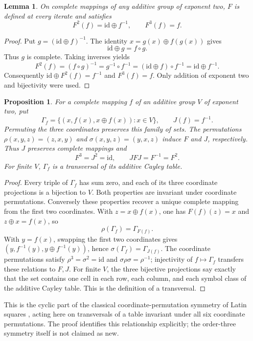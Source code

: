 \documentclass[11pt]{article}
\newtheorem{lemma}[theorem]{Lemma}
\newtheorem{proposition}[theorem]{Proposition}
\begin{document}
\begin{lemma}\label{lem:F3}
On complete mappings of any additive group of exponent two, $F$ is defined
at every iterate and satisfies
\[
F^2(f)=\mathrm{id}\oplus f^{-1},\qquad F^3(f)=f.
\]
\end{lemma}
\begin{proof}
Put $g=(\mathrm{id}\oplus f)^{-1}$. The identity
$x=g(x)\oplus f(g(x))$ gives
\[
\mathrm{id}\oplus g=f\circ g.
\]
Thus $g$ is complete. Taking inverses yields
\[
F^2(f)=(f\circ g)^{-1}
=g^{-1}\circ f^{-1}
=(\mathrm{id}\oplus f)\circ f^{-1}
=\mathrm{id}\oplus f^{-1}.
\]
Consequently $\mathrm{id}\oplus F^2(f)=f^{-1}$ and $F^3(f)=f$.
Only addition of exponent two and bijectivity were used.
\end{proof}

\begin{proposition}\label{prop:F-parastrophy}
For a complete mapping $f$ of an additive group $V$ of exponent two, put
\[
\Gamma_f=\{(x,f(x),x\oplus f(x)):x\in V\},\qquad J(f)=f^{-1}.
\]
Permuting the three coordinates preserves this family of sets. The permutations
$\rho(x,y,z)=(z,x,y)$ and $\sigma(x,y,z)=(y,x,z)$ induce $F$ and $J$,
respectively. Thus $J$ preserves complete mappings and
\[
F^3=J^2=\mathrm{id},\qquad JFJ=F^{-1}=F^2.
\]
For finite $V$, $\Gamma_f$ is a transversal of its additive Cayley table.
\end{proposition}
\begin{proof}
Every triple of $\Gamma_f$ has sum zero, and each of its three coordinate
projections is a bijection to $V$. Both properties are invariant under
coordinate permutations. Conversely these properties recover a unique complete
mapping from the first two coordinates. With $z=x\oplus f(x)$, one has
$F(f)(z)=x$ and $z\oplus x=f(x)$, so
\[
\rho(\Gamma_f)=\Gamma_{F(f)}.
\]
With $y=f(x)$, swapping the first two coordinates gives
$(y,f^{-1}(y),y\oplus f^{-1}(y))$, hence
$\sigma(\Gamma_f)=\Gamma_{J(f)}$.
The coordinate permutations satisfy
$\rho^3=\sigma^2=\mathrm{id}$ and $\sigma\rho\sigma=\rho^{-1}$;
injectivity of $f\mapsto\Gamma_f$ transfers these relations to $F,J$.
For finite $V$, the three bijective projections say exactly that the set
contains one cell in each row, each column, and each symbol class of the
additive Cayley table. This is the definition of a transversal.
\end{proof}
This is the cyclic part of the classical coordinate-permutation symmetry of
Latin squares \cite{MW22}, acting here on transversals of a table invariant
under all six coordinate permutations. The proof identifies this relationship
explicitly; the order-three symmetry itself is not claimed as new.
\end{document}
